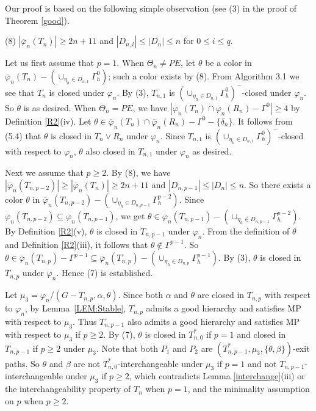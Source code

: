 \documentclass[11pt]{article}
\begin{document}
Our proof is based on the following simple observation (see (3) in the proof of Theorem \ref{good}). 


(8) $|\overline{\varphi}_n(T_n)|\ge 2n+11$ and $|D_{n,i}|\le |D_n|\le n$ for $0\le i \le q$. 

Let us first assume that $p=1$.  When $\Theta_n \ne PE$, let $\theta$ be a color in 
$\overline{\varphi}_n(T_n)-(\cup_{\eta_h\in D_{n,1}}\Gamma^{0}_h)$; such a color exists by (8). 
From Algorithm 3.1 we see that $T_n$ is closed under $\varphi_n$. 
By (3), $T_{n,1}$ is $(\cup_{\eta_h\in D_{n,1}}
\Gamma^{0}_h)^-$-closed under $\varphi_n$. So $\theta$ is as desired. When $\Theta_n=PE$, we have
$|\overline{\varphi}_n(T_n) \cap \overline{\varphi}_n(R_n)-\Gamma^0|\ge 4$ by Definition \ref{R2}(iv).
Let $\theta \in \overline{\varphi}_n(T_n) \cap \overline{\varphi}_n(R_n)-\Gamma^0-\{\delta_n\}$. 
It follows from (5.4) that $\theta$ is closed in $T_n \vee R_n$ under $\varphi_n$.  Since 
$T_{n,1}$ is $(\cup_{\eta_h\in D_{n,1}} \Gamma^{0}_h)^-$-closed with respect to $\varphi_n$,  $\theta$ also closed in $T_{n,1}$ under $\varphi_n$ as desired.
 
Next we assume that $p\geq 2$. By (8), we have $|\overline{\varphi}_n(T_{n,p-2})|\ge |\overline{\varphi}_n(T_{n})|
\ge 2n+11$ and $|D_{n,p-1}|\le |D_n|\le n$. So there exists a color $\theta$ in 
$\overline{\varphi}_n(T_{n,p-2})-(\cup_{\eta_h\in D_{n,p-1}}\Gamma^{p-2}_h)$. Since $\overline{\varphi}_n(T_{n,p-2}) 
\subseteq \overline{\varphi}_n(T_{n,p-1})$, we get $\theta \in \overline{\varphi}_n(T_{n,p-1})-(\cup_{\eta_h\in D_{n,p-1}}\Gamma^{p-2}_h)$. 
By Definition \ref{R2}(v), $\theta$ is closed in $T_{n, p-1}$ under 
$\varphi_n$.  From the definition of $\theta$ and Definition \ref{R2}(iii), it follows that 
$\theta \notin \Gamma^{p-1}$. So $\theta \in \overline{\varphi}_n(T_{n,p})- \Gamma^{p-1} \subseteq  \overline{\varphi}_n(T_{n,p}) - 
(\cup_{\eta_h\in D_{n,p}}\Gamma^{p-1}_h)$. By (3), $\theta$ is closed in $T_{n, p}$ under $\varphi_n$. Hence (7) is 
established. 


Let $\mu_3=\varphi_n/(G-T_{n,p}, \alpha,\theta)$. Since both $\alpha$ and $\theta$ are closed in $T_{n,p}$ with
respect to $\varphi_n$, by Lemma~\ref{LEM:Stable}, $T_{n,p}$ admits a good hierarchy and satisfies
MP with respect to $\mu_3$. Thus $T_{n,p-1}$ also admits a good hierarchy and satisfies
MP with respect to $\mu_3$ if $p\ge 2$. By (7), $\theta$ is closed in $T_{n,0}^*$ if $p=1$ and closed in  $T_{n,p-1}$
if $p \ge 2$ under $\mu_3$.  Note that both $P_1$ and $P_2$ are  $(T_{n,p-1}^*, \mu_3, \{\theta, \beta\})$-exit 
paths. So $\theta$ and $\beta$ are not $T_{n,0}^*$-interchangeable under $\mu_3$ if $p=1$ 
and not $T_{n,p-1}$-interchangeable under $\mu_3$ if $p\ge 2$, which contradicts 
Lemma \ref{interchange}(iii) or the interchangeability property of $T_n$ when $p=1$, and the minimality assumption on $p$ when $p\ge 2$. 
\end{document}
